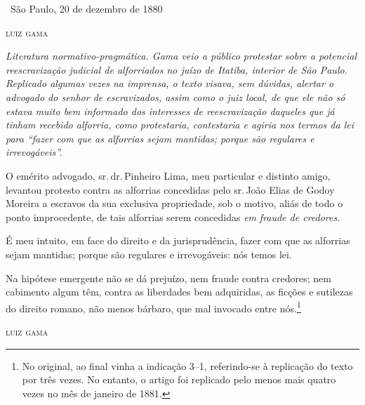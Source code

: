 \medskip

\hfill\ São Paulo, 20 de dezembro de 1880

\hfill\textsc{luiz gama}


\begin{resumo}
\emph{Literatura normativo-pragmática. Gama veio a público protestar
sobre a potencial reescravização judicial de alforriados no juízo de
Itatiba, interior de São Paulo. Replicado algumas vezes na imprensa, o
texto visava, sem dúvidas, alertar o advogado do senhor de escravizados,
assim como o juiz local, de que ele não só estava muito bem informado
dos interesses de reescravização daqueles que já tinham recebido
alforria, como protestaria, contestaria e agiria nos termos da lei para
``fazer com que as alforrias sejam mantidas; porque são regulares e
irrevogáveis''. }
\end{resumo}

O emérito advogado, sr.\,dr.\,Pinheiro Lima, meu particular e distinto
amigo, levantou protesto contra as alforrias concedidas pelo sr.\,João
Elias de Godoy Moreira a escravos da sua exclusiva propriedade, sob o
motivo, aliás de todo o ponto improcedente, de tais alforrias serem
concedidas \emph{em} \emph{fraude de credores}.

É meu intuito, em face do direito e da jurisprudência, fazer com que as
alforrias sejam mantidas; porque são regulares e irrevogáveis: nós temos
lei.

Na hipótese emergente não se dá prejuízo, nem fraude contra credores;
nem cabimento algum têm, contra as liberdades bem adquiridas, as ficções
e sutilezas do direito romano, não menos bárbaro, que mal invocado entre
nós.\footnote{No original, ao final vinha a indicação 3--1, referindo-se à replicação do texto por três vezes. No entanto, o artigo foi replicado pelo menos mais
  quatro vezes no mês de janeiro de 1881.}

\hfill\textsc{luiz gama}

